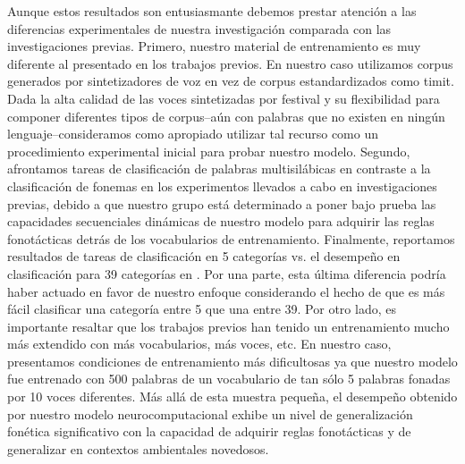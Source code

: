 Aunque estos resultados son entusiasmante debemos prestar atención a las diferencias experimentales de nuestra investigación comparada con las investigaciones previas. Primero, nuestro material de entrenamiento es muy diferente al presentado en los trabajos previos. En nuestro caso utilizamos corpus generados por sintetizadores de voz en vez de corpus estandardizados como \gls{timit}. Dada la alta calidad de las voces sintetizadas por \gls{festival} \cite{festival2014} y su flexibilidad para componer diferentes tipos de corpus--aún con palabras que no existen en ningún lenguaje--consideramos como apropiado utilizar tal recurso como un procedimiento experimental inicial para probar nuestro modelo. Segundo, afrontamos tareas de clasificación de palabras multisilábicas en contraste a la clasificación de fonemas en los experimentos llevados a cabo en investigaciones previas, debido a que nuestro grupo está determinado a poner bajo prueba las capacidades secuenciales dinámicas de nuestro modelo para adquirir las reglas fonotácticas detrás de los vocabularios de entrenamiento. Finalmente, reportamos resultados de tareas de clasificación en 5 categorías vs. el desempeño en clasificación para 39 categorías en \cite{Lee:2009:UFL:2984093.2984217}. Por una parte, esta última diferencia podría haber actuado en favor de nuestro enfoque considerando el hecho de que es más fácil clasificar una categoría entre 5 que una entre 39. Por otro lado, es importante resaltar que los trabajos previos han tenido un entrenamiento mucho más extendido con más vocabularios, más voces, etc. En nuestro caso, presentamos condiciones de entrenamiento más dificultosas ya que nuestro modelo fue entrenado con 500 palabras de un vocabulario de tan sólo 5 palabras fonadas por 10 voces diferentes. Más allá de esta muestra pequeña, el desempeño obtenido por nuestro modelo neurocomputacional exhibe un nivel de generalización fonética significativo con la capacidad de adquirir reglas fonotácticas y de generalizar en contextos ambientales novedosos. 

